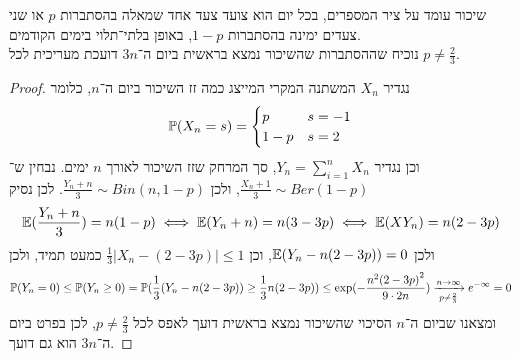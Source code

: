 \question{}
שיכור עומד על ציר המספרים, בכל יום הוא צועד צעד אחד שמאלה בהסתברות $p$ או שני צעדים ימינה בהסתברות $1 - p$, באופן בלתי־תלוי בימים הקודמים. \\
נוכיח שההסתברות שהשיכור נמצא בראשית ביום ה־$3n$ דועכת מעריכית לכל $p \ne \frac{2}{3}$.
\begin{proof}
	נגדיר $X_n$ המשתנה המקרי המייצג כמה זז השיכור ביום ה־$n$, כלומר
	\[
		\mathbb{P}(X_n = s)
		= \begin{cases}
			p & s = -1 \\
			1 - p & s = 2
		\end{cases}
	\]
	וכן נגדיר $Y_n = \sum_{i = 1}^{n} X_n$, סך המרחק שזז השיכור לאורך $n$ ימים.
	נבחין ש־$\frac{X_n + 1}{3} \sim Ber(1 - p)$, ולכן $\frac{Y_n + n}{3} \sim Bin(n, 1 - p)$.
	לכן נסיק
	\[
		\mathbb{E}(\frac{Y_n + n}{3})
		= n (1 - p)
		\iff
		\mathbb{E}(Y_n + n) = n (3 - 3p)
		\iff
		\mathbb{E}(XY_n) = n(2 - 3p)
	\]
	ולכן $\mathbb{E}(Y_n - n(2 - 3p)) = 0$, וכן $\frac{1}{3} |X_n - (2 - 3p)| \le 1$ כמעט תמיד, ולכן
	\[
		\mathbb{P}(Y_n = 0)
		\le \mathbb{P}(Y_n \ge 0)
		= \mathbb{P}(\frac{1}{3}(Y_n - n(2 - 3p)) \ge \frac{1}{3} n(2 - 3p))
		\le \exp(-\frac{n^2 {(2 - 3p)}^2}{9 \cdot 2n})
		\xrightarrow[p \ne \frac{2}{3}]{n \to \infty} e^{-\infty}
		= 0
	\]
	ומצאנו שביום ה־$n$ הסיכוי שהשיכור נמצא בראשית דועך לאפס לכל $p \ne \frac{2}{3}$, לכן בפרט ביום ה־$3n$ הוא גם דועך.
\end{proof}


